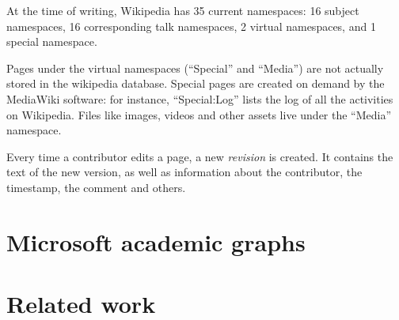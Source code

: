 At the time of writing, Wikipedia has 35 current namespaces: 16 subject namespaces, 16 corresponding talk namespaces, 2 virtual namespaces, and 1 special namespace.

Pages under the virtual namespaces (``Special'' and ``Media'') are not actually stored in the wikipedia database.
Special pages are created on demand by the MediaWiki software: for instance, ``Special:Log'' lists the log of all the activities on Wikipedia.
Files like images, videos and other assets live under the ``Media'' namespace.

Every time a contributor edits a page, a new \emph{revision} is created.
It contains the text of the new version, as well as information about the contributor, the timestamp, the comment and others.

\section{Microsoft academic graphs}
\label{sec:mag}


\section{Related work}
\label{sec:relatedwork}
